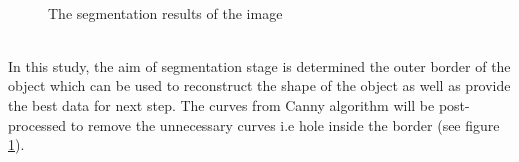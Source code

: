 \documentclass[twoside,twocolumn,10pt]{article}
\begin{document}
\begin{figure}[h]
\centering
{}~~ 
\caption{The segmentation results of the image}
\label{canny}
\end{figure}~\\
In this study, the aim of segmentation stage is determined the outer
border of the object which can be used to reconstruct the shape of the
object as well as provide the best data for next step. The curves from
Canny algorithm will be post-processed to remove the unnecessary
curves i.e hole inside the border (see figure \ref{canny}).
\end{document}
